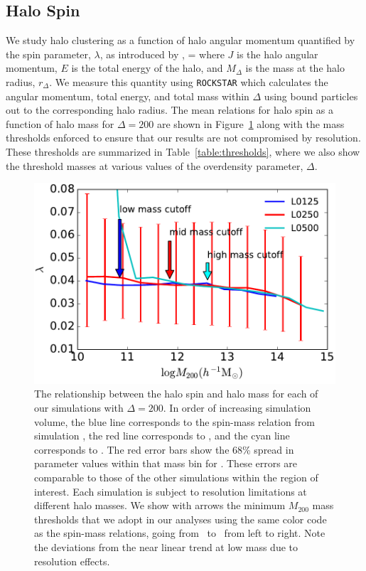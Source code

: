 \documentclass[usenatbib,fleqn]{mnras}
\begin{document}
\subsection{Halo Spin}

We study halo clustering as a function of halo angular momentum quantified 
by the spin parameter, $\lambda$, as introduced by \citep{peebles69},
\beq
\lambda = 
\eeq
where $J$ is the halo angular momentum, $E$ is the total energy of the 
halo, and $M_{\Delta}$ is the mass at the halo radius, $r_{\Delta}$. We measure this quantity using {\tt ROCKSTAR} which calculates the angular momentum, total energy, and total mass within $\Delta$ using bound particles out to the corresponding halo radius.
The mean relations for halo spin as a function of halo mass for $\Delta=200$ are shown in Figure~\ref{fig:spinrelation} along with the mass thresholds enforced to ensure that our results are not compromised by resolution. These thresholds are summarized in Table~\ref{table:thresholds}, where we also show the threshold masses at various values of the overdensity parameter, $\Delta$.

\begin{figure}
\centering
\includegraphics[width=.5\textwidth]{masscut_spin_d200.pdf}
\caption{
The relationship between the halo spin and halo mass for each of our simulations with $\Delta =200$. 
In order of increasing simulation volume, the blue line corresponds to the spin-mass relation from simulation 
\simA, the red line corresponds to \simB, and the cyan line corresponds to \simC. The red error bars show the 68\% spread in
parameter values within that mass bin for \simB. These errors are comparable to those of the other simulations
within the region of interest.
Each simulation is subject to resolution limitations at different halo masses. We show with arrows 
the minimum $M_{200}$ mass thresholds that we adopt in our analyses using the same color code as 
the spin-mass relations, going from \simA \ to \simC \ from left to right. Note the deviations from the near linear trend at low mass due to resolution effects.}
\label{fig:spinrelation}
\end{figure}
\end{document}
